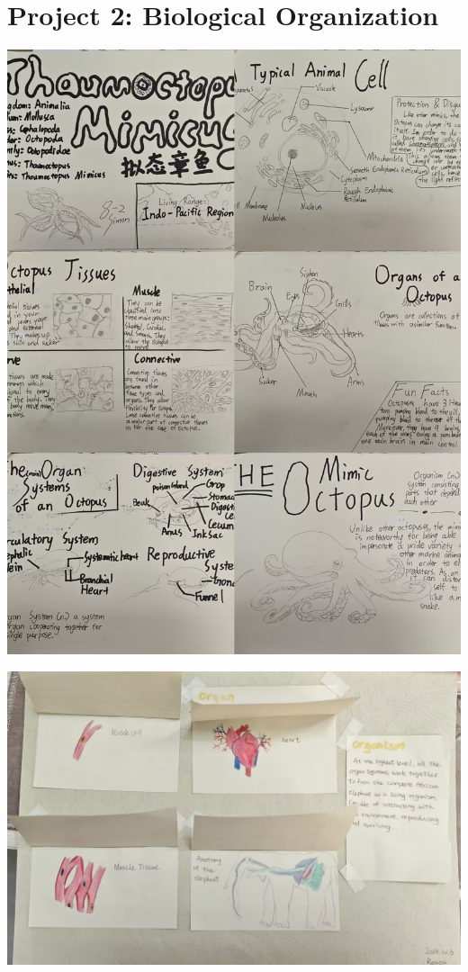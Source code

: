 \documentclass[
]{book}
\begin{document}
\hypertarget{project-2-biological-organization}{%
\section{Project 2: Biological Organization}\label{project-2-biological-organization}}

\includegraphics{./img/p2-1.jpg}

\includegraphics{./img/p2-2.jpg}
\end{document}

